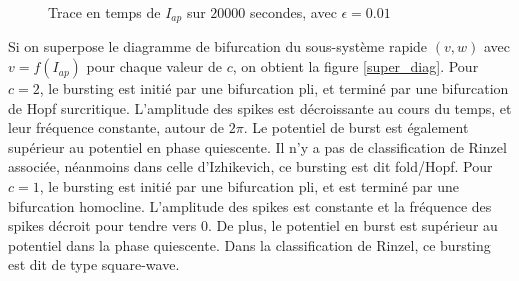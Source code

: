 \documentclass[12pt,a4paper,onecolumn]{article}
\begin{document}
\begin{figure}[H]
\begin{center}
\begin{tabular}{p{}  p{}}
		\end{tabular}
	\end{center}
	\caption{Trace en temps de $I_{ap}$ sur $20000$ secondes, avec $\epsilon = 0.01$}
	\label{fig_trace_iap}
\end{figure}

Si on superpose le diagramme de bifurcation du sous-système rapide $(v,w)$ avec $v=f(I_{ap})$ pour chaque valeur de $c$, on obtient la figure \ref{super_diag}. Pour $c=2$, le bursting est initié par une bifurcation pli, et terminé par une bifurcation de Hopf surcritique. L'amplitude des spikes est décroissante au cours du temps, et leur fréquence constante, autour de $2\pi$. Le potentiel de burst est également supérieur au potentiel en phase quiescente. Il n'y a pas de classification de Rinzel associée, néanmoins dans celle d'Izhikevich, ce bursting est dit fold/Hopf. Pour $c=1$, le bursting est initié par une bifurcation pli, et est terminé par une bifurcation homocline. L'amplitude des spikes est constante et la fréquence des spikes décroit pour tendre vers 0. De plus, le potentiel en burst est supérieur au potentiel dans la phase quiescente. Dans la classification de Rinzel, ce bursting est dit de type square-wave.
\end{document}
